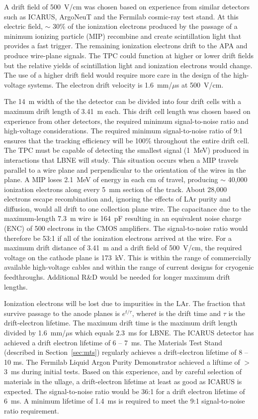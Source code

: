 A drift field of 500~V/cm was chosen based on experience from similar detectors such as ICARUS, ArgoNeuT and the Fermilab cosmic-ray test stand. At this electric field, $\sim$ 30\% of the ionization electrons produced by the passage of a minimum ionizing particle (MIP) recombine and create scintillation light that provides a fast trigger. The remaining ionization electrons drift to the APA and produce wire-plane signals. The TPC could function at higher or lower drift fields but the relative yields of scintillation light and ionization electrons would change. The use of a higher drift field would require more care in the design of the high-voltage systems. The electron drift velocity is 1.6~mm/$\mu$s at 500~V/cm.

The 14~m width of the the detector can be divided into four drift cells with a maximum drift length of 3.41~m each. This drift cell length was chosen based on experience from other detectors, the required minimum signal-to-noise ratio and high-voltage considerations. The required minimum signal-to-noise ratio of 9:1 ensures that the tracking efficiency will be 100\% throughout the entire drift cell. The TPC must be capable of detecting the smallest signal (1~MeV) produced in interactions that LBNE will study. This situation occurs when a MIP travels parallel to a wire plane and perpendicular to the orientation of the wires in the plane. A MIP loses 2.1~MeV of energy in each cm of travel, producing $\sim$ 40,000 ionization electrons along every 5~mm section of the track. About 28,000 electrons escape recombination and, ignoring the effects of LAr purity and diffusion, would all drift to one collection plane wire. The capacitance due to the maximum-length 7.3~m wire is 164~pF resulting in an equivalent noise charge (ENC) of 500 electrons in the CMOS amplifiers. The signal-to-noise ratio would therefore be 53:1 if all of the ionization electrons arrived at the wire. For a maximum drift distance of 3.41~m and a drift field of 500~V/cm, the required voltage on the cathode plane is 173~kV. This is within the range of commercially available high-voltage cables and within the range of current designs for cryogenic feedthroughs. Additional R\&D would be needed for longer maximum drift lengths.

Ionization electrons will be lost due to impurities in the LAr. The fraction that survive passage to the anode planes is $e^{t/\tau}$, where$t$ is the drift time and $\tau$ is the drift-electron lifetime. The maximum drift time is the maximum drift length divided by 1.6~mm/$\mu$s which equals 2.3~ms for LBNE. The ICARUS detector has achieved a drift electron lifetime of 6 -- 7~ms. The Materials Test Stand (described in Section~\ref{sec:mts}) regularly achieves a drift-electron lifetime of 8 -- 10 ms. The Fermilab Liquid Argon Purity Demonstrator achieved a liftime of $>$ 3~ms during initial tests. Based on this experience, and by careful selection of materials in the ullage,  a drift-electron lifetime at least as good as ICARUS is expected. The signal-to-noise ratio would be 36:1 for a drift electron lifetime of 6~ms. A minimum lifetime of 1.4~ms is required to meet the 9:1 signal-to-noise ratio requirement.

